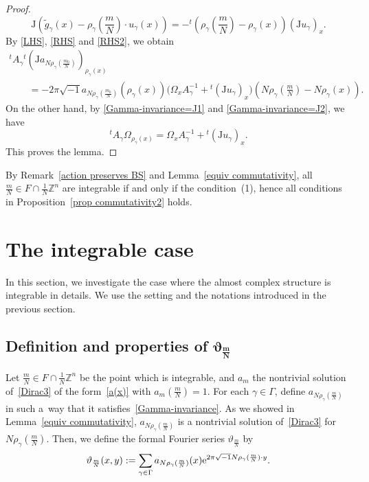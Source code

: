 \documentclass[10pt,a4paper]{amsart}
\numberwithin{equation}{section}
\newcommand{\Z}{\mathbb{Z}}
\renewcommand{\tilde}{\widetilde}
\def\J{\mathrm{J}}
\begin{document}
\begin{proof}
\begin{equation}
\J \left( {\tilde g}_\gamma(x)-\rho_\gamma\left(\frac{m}{N}\right)\cdot u_\gamma (x)\right)=-{}^t\left(\rho_\gamma \left(\frac{m}{N}\right)-\rho_\gamma (x)\right)\left(\J u_\gamma\right)_x.
\end{equation}
By \eqref{LHS}, \eqref{RHS} and \eqref{RHS2}, we obtain
\begin{gather*}
{}^tA_\gamma {}^t( \J a_{N\rho_\gamma (\frac{m_0}{N})})_{\rho_\gamma (x)}\\
\qquad=-2\pi\sqrt{-1}a_{N\rho_\gamma (\frac{m_0}{N})}(\rho_\gamma(x))\bigl(\Omega_xA_\gamma^{-1}+{}^t(\J u_\gamma)_x\bigr)\left(N\rho_\gamma \left(\frac{m}{N}\right)-N\rho_\gamma (x)\right) .
\end{gather*}
On the other hand, by \eqref{Gamma-invariance=J1} and \eqref{Gamma-invariance=J2}, we have
\begin{equation}\label{Gamma-relation of Omega}
{}^tA_\gamma \Omega_{\rho_\gamma (x)}=\Omega_xA_\gamma^{-1}+{}^t\left(\J u_\gamma\right)_x.
\end{equation}
This proves the lemma.
\end{proof}

\begin{Remark}\label{equiv commutativity2}
By Remark~\ref{action preserves BS} and Lemma~\ref{equiv commutativity}, all $\frac{m}{N}\in F\cap \frac{1}{N}\Z^n$ are integrable if and only if the condition~(1), hence all conditions in Proposition~\ref{prop commutativity2} holds.
\end{Remark}


\section{The integrable case}\label{the integrable case}
In this section, we investigate the case where the almost complex structure is integrable in details. We use the setting and the notations introduced in the previous section.

\subsection[Definition and properties of vartheta\_m/N]{Definition and properties of $\boldsymbol{\vartheta_{\frac{m}{N}}}$}
Let $\frac{m}{N}\in F\cap \frac{1}{N}\Z^n$ be the point which is integrable, and $a_m$ the nontrivial solution of~\eqref{Dirac3} of the form~\eqref{a(x)} with $a_m(\frac{m}{N})=1$. For each $\gamma \in \Gamma$, define $a_{N\rho_\gamma (\frac{m}{N})}$ in such a~way that it satisfies~\eqref{Gamma-invariance}. As we showed in Lemma~\ref{equiv commutativity}, $a_{N\rho_\gamma (\frac{m}{N})}$ is a nontrivial solution of~\eqref{Dirac3} for~$N\rho_\gamma (\frac{m}{N})$. Then, we define the formal Fourier series $\vartheta_{\frac{m}{N}}$ by
\begin{equation}\label{theta}
\vartheta_{\frac{m}{N}}(x,y):=\sum_{\gamma \in \Gamma}a_{N\rho_\gamma (\frac{m}{N})}(x){\rm e}^{2\pi\sqrt{-1}N\rho_\gamma (\frac{m}{N})\cdot y}.
\end{equation}
\end{document}

